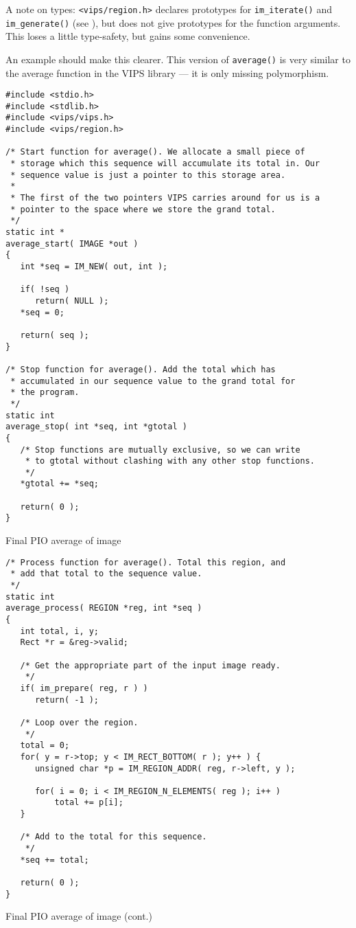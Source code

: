 A note on types: \verb+<vips/region.h>+ declares prototypes for
\verb+im_iterate()+ and \verb+im_generate()+ (see ),
but does not give prototypes for the function arguments. This loses a
little type-safety, but gains some convenience.

An example should make this clearer. This version of \verb+average()+
is very similar to the average function in the VIPS library --- it is only
missing polymorphism.

\begin{fig2}
\begin{verbatim}
#include <stdio.h>
#include <stdlib.h>
#include <vips/vips.h>
#include <vips/region.h>

/* Start function for average(). We allocate a small piece of
 * storage which this sequence will accumulate its total in. Our
 * sequence value is just a pointer to this storage area.
 *
 * The first of the two pointers VIPS carries around for us is a
 * pointer to the space where we store the grand total.
 */
static int *
average_start( IMAGE *out )
{
   int *seq = IM_NEW( out, int );

   if( !seq )
      return( NULL );
   *seq = 0;

   return( seq );
}

/* Stop function for average(). Add the total which has 
 * accumulated in our sequence value to the grand total for 
 * the program.
 */
static int
average_stop( int *seq, int *gtotal )
{
   /* Stop functions are mutually exclusive, so we can write 
    * to gtotal without clashing with any other stop functions.
    */
   *gtotal += *seq;

   return( 0 );
}
\end{verbatim}
\caption{Final PIO average of image}
\label{fg:p2average}
\end{fig2}

\begin{fig2}
\begin{verbatim}
/* Process function for average(). Total this region, and 
 * add that total to the sequence value.
 */
static int
average_process( REGION *reg, int *seq )
{
   int total, i, y;
   Rect *r = &reg->valid;

   /* Get the appropriate part of the input image ready.
    */
   if( im_prepare( reg, r ) )
      return( -1 ); 

   /* Loop over the region.
    */
   total = 0;
   for( y = r->top; y < IM_RECT_BOTTOM( r ); y++ ) {
      unsigned char *p = IM_REGION_ADDR( reg, r->left, y );

      for( i = 0; i < IM_REGION_N_ELEMENTS( reg ); i++ )
          total += p[i];
   }

   /* Add to the total for this sequence.
    */
   *seq += total;

   return( 0 );
}
\end{verbatim}
\caption{Final PIO average of image (cont.)}
\end{fig2}

